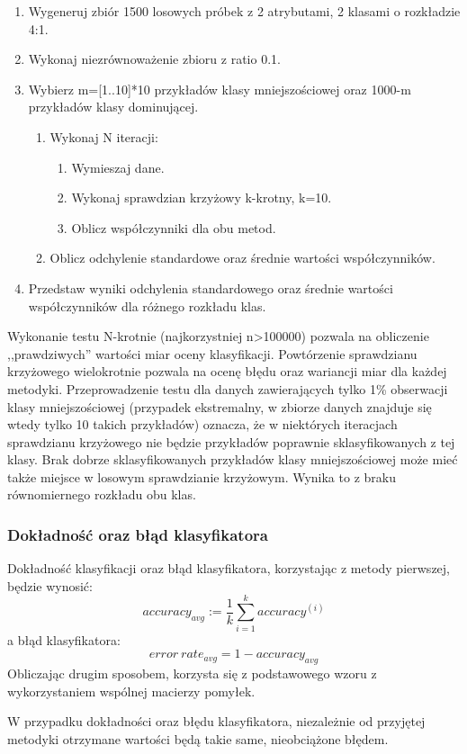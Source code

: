 \begin{enumerate}
	\item Wygeneruj zbiór 1500 losowych próbek z 2 atrybutami, 2 klasami o rozkładzie 4:1.
	\item Wykonaj niezrównoważenie zbioru z ratio 0.1.
	\item Wybierz m=[1..10]*10 przykładów klasy mniejszościowej oraz 1000-m przykładów klasy dominującej.
	\begin{enumerate}
		\item  Wykonaj N iteracji:
		\begin{enumerate}
			\item Wymieszaj dane.
			\item Wykonaj sprawdzian krzyżowy k-krotny, k=10.
			\item Oblicz współczynniki dla obu metod.
		\end{enumerate}
		\item Oblicz odchylenie standardowe oraz średnie wartości współczynników.
	\end{enumerate}
	\item Przedstaw wyniki odchylenia standardowego oraz średnie wartości współczynników dla różnego rozkładu klas.
\end{enumerate}
Wykonanie testu N-krotnie (najkorzystniej n>100000) pozwala na obliczenie ,,prawdziwych'' wartości miar oceny klasyfikacji. Powtórzenie sprawdzianu krzyżowego wielokrotnie pozwala na ocenę błędu oraz wariancji miar dla każdej metodyki. Przeprowadzenie testu dla danych zawierających tylko 1\% obserwacji klasy mniejszościowej (przypadek ekstremalny, w zbiorze danych znajduje się wtedy tylko 10 takich przykładów) oznacza, że w niektórych iteracjach sprawdzianu krzyżowego nie będzie przykładów poprawnie sklasyfikowanych z tej klasy. Brak dobrze sklasyfikowanych przykładów klasy mniejszościowej może mieć także miejsce w losowym sprawdzianie krzyżowym. Wynika to z braku równomiernego rozkładu obu klas. 
\subsubsection{Dokładność oraz błąd klasyfikatora}
Dokładność klasyfikacji oraz błąd klasyfikatora, korzystając z metody pierwszej, będzie wynosić:
\[accuracy_{avg} := \frac{1}{k} \sum_{i=1}^{k} accuracy^{(i)}\]
a błąd klasyfikatora:
\[error\ rate_{avg} = 1 - accuracy_{avg}\]
Obliczając drugim sposobem, korzysta się z podstawowego wzoru z wykorzystaniem wspólnej macierzy pomyłek. \par
W przypadku dokładności oraz błędu klasyfikatora, niezależnie od przyjętej metodyki otrzymane wartości będą takie same, nieobciążone błędem.
